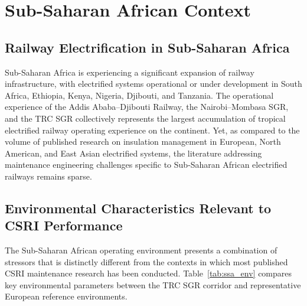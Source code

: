 \documentclass[preprint,12pt,3p]{elsarticle}
\begin{document}
\section{Sub-Saharan African Context}
\label{sec:ssa}

\subsection{Railway Electrification in Sub-Saharan Africa}

Sub-Saharan Africa is experiencing a significant expansion of railway
infrastructure, with electrified systems operational or under
development in South Africa, Ethiopia, Kenya, Nigeria, Djibouti,
and Tanzania. The operational experience of the Addis Ababa--Djibouti
Railway, the Nairobi--Mombasa SGR, and the TRC SGR collectively
represents the largest accumulation of tropical electrified railway
operating experience on the continent. Yet, as compared to the volume
of published research on insulation management in European, North
American, and East Asian electrified systems, the literature addressing
maintenance engineering challenges specific to Sub-Saharan African
electrified railways remains sparse.

\subsection{Environmental Characteristics Relevant to CSRI Performance}

The Sub-Saharan African operating environment presents a combination
of stressors that is distinctly different from the contexts in which
most published CSRI maintenance research has been conducted.
Table~\ref{tab:ssa_env} compares key environmental parameters
between the TRC SGR corridor and representative European reference
environments.
\end{document}
